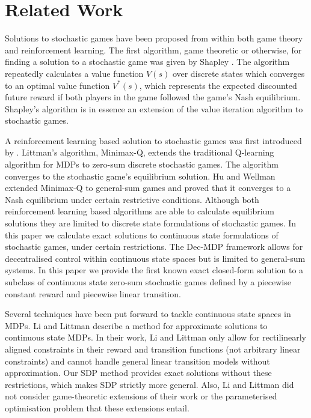 \section{Related Work}
\label{sec:relatedwork}

Solutions to stochastic games have been proposed from within both
game theory and reinforcement learning. The first algorithm, game theoretic or otherwise, for 
finding a solution to a stochastic game was given by Shapley \cite{Shapley_PotNAoS_1953}.
The algorithm repeatedly calculates a value function $V(s)$ over discrete states
which converges to an optimal value function $V^{*}(s)$, which represents
the expected discounted future reward if both players in the game followed
the game's Nash equilibrium. Shapley's algorithm is in essence an 
extension of the value iteration algorithm to stochastic games. 

A reinforcement 
learning based solution to stochastic games was first introduced by 
\cite{Littman_ICML_1994}. Littman's algorithm, Minimax-Q,
extends the traditional Q-learning algorithm for MDPs to 
zero-sum discrete stochastic games. The algorithm converges to the 
stochastic game's equilibrium solution. Hu and Wellman \cite{Hu_ICML_1998}
extended Minimax-Q to general-sum games and proved that it converges
to a Nash equilibrium under certain restrictive conditions. Although
both reinforcement learning based algorithms are able to calculate 
equilibrium solutions they are limited to discrete state formulations of
stochastic games. In this paper we calculate exact solutions to 
continuous state formulations of stochastic games, under certain restrictions.
The Dec-MDP \cite{Bernstein_MoOR_2002} framework allows
for decentralised control within continuous state spaces but is limited
to general-sum systems. In this paper we provide the first 
known exact closed-form solution to a subclass of continuous state zero-sum 
stochastic games defined by a piecewise constant reward and piecewise linear transition.

Several techniques have been put forward to tackle continuous state
spaces in MDPs. Li and Littman \cite{Li_AAAI_2005} describe a method
for approximate solutions to continuous
state MDPs.  In their work, Li and Littman only allow for rectilinearly aligned 
constraints in their reward and transition functions (not arbitrary linear constraints)
and cannot handle general linear transition models without approximation.  
Our SDP method provides exact solutions without these restrictions, which
makes SDP strictly more general.  Also, Li and Littman did not consider 
game-theoretic extensions of their work or the parameterised optimisation 
problem that these extensions entail.

